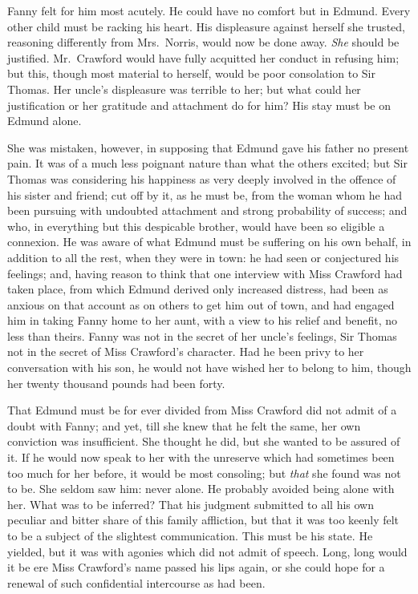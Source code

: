 \documentclass{article}
\begin{document}
Fanny felt for him most acutely.  He could have no comfort
but in Edmund.  Every other child must be racking his heart.
His displeasure against herself she trusted, reasoning
differently from Mrs.\ Norris, would now be done away.
\emph{She} should be justified.  Mr.\ Crawford would have
fully acquitted her conduct in refusing him; but this,
though most material to herself, would be poor consolation
to Sir Thomas.  Her uncle's displeasure was terrible to her;
but what could her justification or her gratitude and
attachment do for him?  His stay must be on Edmund alone.

She was mistaken, however, in supposing that Edmund gave
his father no present pain.  It was of a much less poignant
nature than what the others excited; but Sir Thomas
was considering his happiness as very deeply involved
in the offence of his sister and friend; cut off by it,
as he must be, from the woman whom he had been pursuing
with undoubted attachment and strong probability of success;
and who, in everything but this despicable brother,
would have been so eligible a connexion.  He was aware
of what Edmund must be suffering on his own behalf,
in addition to all the rest, when they were in town:
he had seen or conjectured his feelings; and, having reason
to think that one interview with Miss Crawford had taken place,
from which Edmund derived only increased distress, had been
as anxious on that account as on others to get him out of town,
and had engaged him in taking Fanny home to her aunt,
with a view to his relief and benefit, no less than theirs.
Fanny was not in the secret of her uncle's feelings,
Sir Thomas not in the secret of Miss Crawford's character.
Had he been privy to her conversation with his son, he would
not have wished her to belong to him, though her twenty
thousand pounds had been forty.

That Edmund must be for ever divided from Miss Crawford did
not admit of a doubt with Fanny; and yet, till she knew
that he felt the same, her own conviction was insufficient.
She thought he did, but she wanted to be assured of it.
If he would now speak to her with the unreserve which
had sometimes been too much for her before, it would
be most consoling; but \emph{that} she found was not to be.
She seldom saw him:  never alone.  He probably avoided
being alone with her.  What was to be inferred?  That his
judgment submitted to all his own peculiar and bitter share
of this family affliction, but that it was too keenly
felt to be a subject of the slightest communication.
This must be his state.  He yielded, but it was with
agonies which did not admit of speech.  Long, long would
it be ere Miss Crawford's name passed his lips again,
or she could hope for a renewal of such confidential
intercourse as had been.
\end{document}
